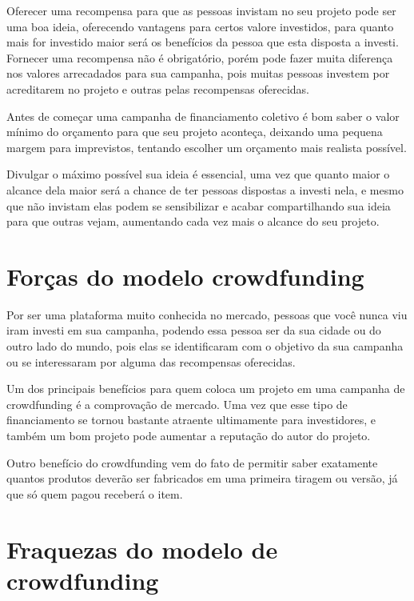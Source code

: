 \documentclass{classe_cn}                 %
\begin{document}
Oferecer uma recompensa para que as pessoas invistam no seu projeto pode ser uma boa ideia, oferecendo vantagens para certos valore investidos, para quanto mais for investido maior será os benefícios da pessoa que esta disposta a investi. Fornecer uma recompensa não é obrigatório, porém pode fazer muita diferença nos valores arrecadados para sua campanha, pois muitas pessoas investem por acreditarem no projeto e outras pelas recompensas oferecidas.

Antes de começar uma campanha de financiamento coletivo é bom saber o valor mínimo do orçamento para que seu projeto aconteça, deixando uma pequena margem para imprevistos, tentando escolher um orçamento mais realista possível.

Divulgar o máximo possível sua ideia é essencial, uma vez que quanto maior o alcance dela maior será a chance de ter pessoas dispostas a investi nela, e mesmo que não invistam elas podem se sensibilizar e acabar compartilhando sua ideia para que outras vejam, aumentando cada vez mais o alcance do seu projeto. \cite{XAVIER:2016}
\section{Forças do modelo crowdfunding}

Por ser uma plataforma muito conhecida no mercado, pessoas que você nunca viu iram investi em sua campanha, podendo essa pessoa ser da sua cidade ou do outro lado do mundo, pois elas se identificaram com o objetivo da sua campanha ou se interessaram por alguma das recompensas oferecidas.

Um dos principais benefícios para quem coloca um projeto em uma campanha de crowdfunding é a comprovação de mercado. Uma vez que esse tipo de financiamento se tornou bastante atraente ultimamente para investidores, e também um bom projeto pode aumentar a reputação do autor do projeto.

Outro benefício do crowdfunding vem do fato de permitir saber exatamente quantos produtos deverão ser fabricados em uma primeira tiragem ou versão, já que só quem pagou receberá o item. \cite{PEREIRA:2016}

\section{Fraquezas do modelo de crowdfunding}
\end{document}

